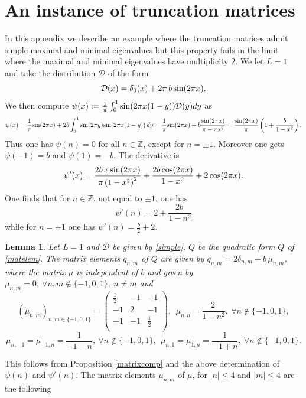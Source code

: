 \documentclass{amsart}
\newtheorem{lem}[thm]{Lemma}
\def\Z{{\mathbb Z}}
\def\cD{{\mathcal D}}
\def\sin{{{\rm sin}}}
\def\cos{{{\rm cos}}}
\def\Z{{\mathbb Z}}
\def\cD{{\mathcal D}}
\def\sin{{{\rm sin}}}
\def\cos{{{\rm cos}}}
\begin{document}
\appendix


\section{An instance of truncation matrices}\label{double}
In this appendix we  describe an example  where the truncation matrices admit simple maximal and minimal eigenvalues but this property fails in the limit where the maximal and minimal eigenvalues have multiplicity $2$. 
We let $L=1$ and take the distribution $\cD$  of the form 
\begin{equation}\label{simple}
\cD(x)= \delta_0(x)+2\pi\, b\, \sin (2 \pi  x).
\end{equation}
We then compute $\psi(x):=\frac 1 \pi \int_0^1 \sin(2\pi x(1- y))\cD(y)dy$ as 
$$
\psi(x)=\frac{1}{\pi }\sin (2 \pi  x)+2b \int_0^1 \sin (2 \pi  y) \sin (2 \pi  x (1-y)) \, dy=\frac{1}{\pi }\sin (2 \pi  x)+b\frac{  \sin (2\pi  x)}{\pi -\pi  x^2}=\frac{  \sin (2\pi  x)}{\pi}\left(1+\frac{b}{1-x^2}\right).
$$
Thus one has $\psi(n)=0$ for all $n\in \Z$, except for $n=\pm 1$. Moreover one gets $\psi(-1)=b$ and $\psi(1)=-b$. The derivative is 
$$
\psi'(x)=\frac{2 b\, x\, \sin (2 \pi  x)}{\pi  \left(1-x^2\right)^2}+\frac{2 b\, \cos (2 \pi  x)}{1-x^2}+2\, \cos (2 \pi  x).
$$
One finds that for $n\in \Z$, not equal to $\pm 1$, one has $$\psi'(n)=2 + \frac{2 b\, }{1-n^2}$$
while for $n=\pm 1$ one has $\psi'(n)=\frac{b}{2}+2$.
\begin{lem}\label{matrixmu} Let $L=1$ and $\cD$ be given by \eqref{simple}, $Q$ be the quadratic form $Q$ of \eqref{matelem}.  The matrix elements $q_{n,m}$ of $Q$ are given by $q_{n,m}=2\delta_{n,m}+b\,\mu_{n,m}$, where the matrix $\mu$ is independent of $b$ and given by $\mu_{n,m}=0,\  \forall n,m  \notin \{-1,0,1\},\ n\neq m$ and
$$
(\mu_{n,m})_{n,m\in \{-1,0,1\}}=\left(
\begin{array}{ccc}
 \frac{1}{2} & -1 & -1 \\
 -1 & 2 & -1 \\
 -1 & -1 & \frac{1}{2} \\
\end{array}
\right), \ \ \mu_{n,n}=\frac{2 \, }{1-n^2}, \ \forall n\notin \{-1,0,1\},
$$
$$
\mu_{n,-1}=\mu_{-1,n}=\frac{1}{-1-n}, \ \forall n\notin \{-1,0,1\}, \ \ \mu_{n,1}=\mu_{1,n}=\frac{1}{-1+n}, \ \forall n\notin \{-1,0,1\}.
$$
\end{lem}
\proof This follows from Proposition \ref{matrixcomp} and the above determination of $\psi(n)$ and $\psi'(n)$.\endproof 
The matrix elements $\mu_{n,m}$ of  $\mu$, for $\vert n\vert \leq 4$ and $\vert m\vert \leq 4$ are the following
\end{document}
